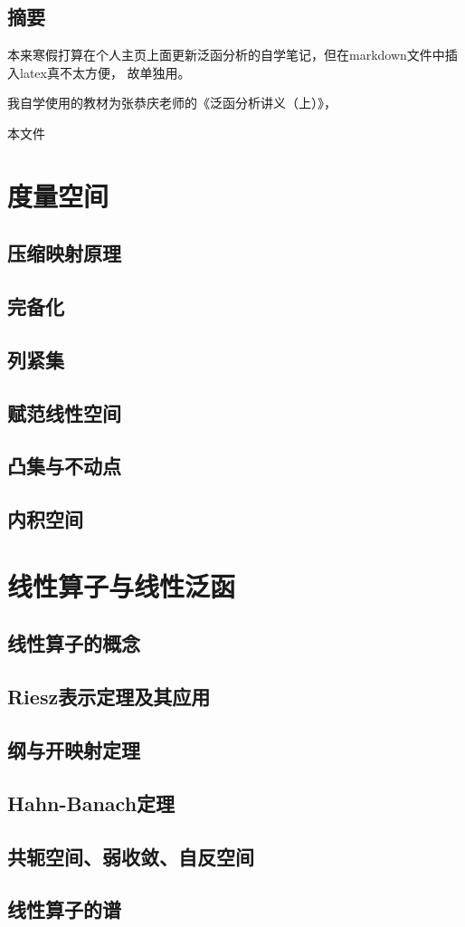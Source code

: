 \documentclass[12pt,a4paper]{article}
\begin{document}
\begin{center}
\section*{摘要}
\end{center}

本来寒假打算在个人主页上面更新泛函分析的自学笔记，但在markdown文件中插入latex真不太方便，
故单独用。

我自学使用的教材为张恭庆老师的《泛函分析讲义（上）》，

本文件

{\centering\tableofcontents}

\newpage
\section{度量空间}
\subsection{压缩映射原理}
\subsection{完备化}
\subsection{列紧集}
\subsection{赋范线性空间}
\subsection{凸集与不动点}
\subsection{内积空间}
\newpage
\section{线性算子与线性泛函}
\subsection{线性算子的概念}
\subsection{Riesz表示定理及其应用}
\subsection{纲与开映射定理}
\subsection{Hahn-Banach定理}
\subsection{共轭空间、弱收敛、自反空间}
\subsection{线性算子的谱}
\end{document}

